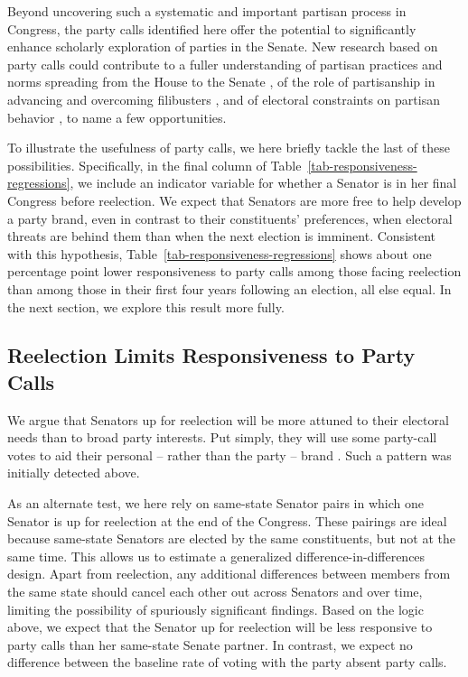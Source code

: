 \documentclass[12pt]{article}
\begin{document}
Beyond uncovering such a systematic and important partisan process in Congress, the party calls identified here offer the potential to significantly enhance scholarly exploration of parties in the Senate. New research based on party calls could contribute to a fuller understanding of partisan practices and norms spreading from the House to the Senate \citep[e.g.,][]{Theriault:2013}, of the role of partisanship in advancing and overcoming filibusters \citep[e.g.,][]{Wawro:2004}, and of electoral constraints on partisan behavior \citep[e.g.,][]{Levitt:1996}, to name a few opportunities.

To illustrate the usefulness of party calls, we here briefly tackle the last of these possibilities. Specifically, in the final column of Table~\ref{tab-responsiveness-regressions}, we include an indicator variable for whether a Senator is in her final Congress before reelection. We expect that Senators are more free to help develop a party brand, even in contrast to their constituents' preferences, when electoral threats are behind them than when the next election is imminent. Consistent with this hypothesis, Table~\ref{tab-responsiveness-regressions} shows about one percentage point lower responsiveness to party calls among those facing reelection than among those in their first four years following an election, all else equal. In the next section, we explore this result more fully.

\subsection*{Reelection Limits Responsiveness to Party Calls}

We argue that Senators up for reelection will be more attuned to their electoral needs than to broad party interests. Put simply, they will use some party-call votes to aid their personal -- rather than the party -- brand
\citep[e.g.,][]{Canes-Wrone:2002, Carson:2010}.  Such a pattern was initially detected above.

As an alternate test, we here rely on same-state Senator pairs in which one Senator is up for reelection at the end of the Congress. These pairings are ideal because same-state Senators are elected by the same constituents, but not at the same time. This allows us to estimate a generalized difference-in-differences design. Apart from reelection, any additional differences between members from the same state should cancel each other out across Senators and over time, limiting the possibility of spuriously significant findings. Based on the logic above, we expect that the Senator up for reelection will be less responsive to party calls than her same-state Senate partner. In contrast, we expect no difference between the baseline rate of voting with the party absent party calls.
\end{document}
